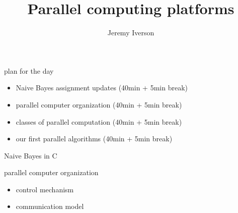 \documentclass[10pt, t]{beamer}
\title{Parallel computing platforms}
\date{}
\author{Jeremy Iverson}
\institute{College of Saint Benedict \& Saint John's University}
\begin{document}
  \maketitle

  \begin{frame}{plan for the day}
    \begin{itemize}
      \item Naive Bayes assignment updates (40min + 5min break)
      \item parallel computer organization (40min + 5min break)
      \item classes of parallel computation (40min + 5min break)
      \item our first parallel algorithms (40min + 5min break)
    \end{itemize}
  \end{frame}

  \begin{frame}[standout]
    Naive Bayes in C
  \end{frame}

  \begin{frame}{parallel computer organization}
    \begin{itemize}
      \pause
      \item control mechanism
      \pause
      \item communication model
    \end{itemize}

  \end{frame}
\end{document}
